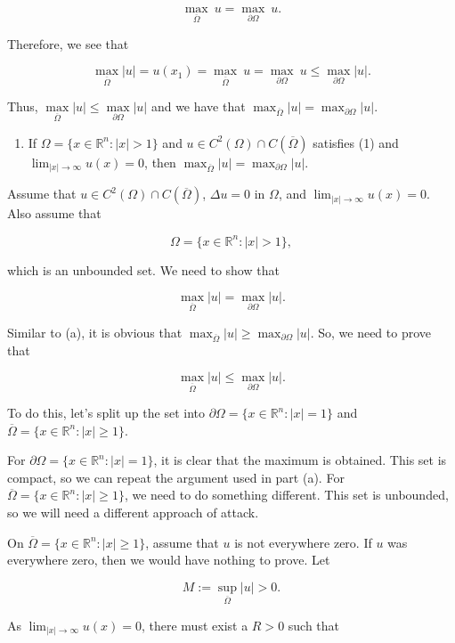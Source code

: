 \documentclass{article}
\begin{document}
$$\underset{\overline\Omega}{\max}~u =\underset{\partial\Omega}{\max}~u.$$

Therefore, we see that

$$\underset{\overline\Omega}{\max}|u|=u(x_1)=\underset{\overline\Omega}{\max}~u=\underset{\partial\Omega}{\max}~u\leq \underset{\partial\Omega}{\max}|u|.$$

Thus, $\underset{\overline\Omega}{\max}|u| \leq\underset{\partial\Omega}{\max}|u|$ and we have that $\max_{\overline\Omega}|u| =\max_{\partial\Omega}|u|$.

\begin{enumerate}[label=(\alph*),start=2]
    \item If $\Omega=\{x\in\mathbb R^n : |x| > 1\}$ and $u\in C^2(\Omega)\cap C(\overline\Omega)$ satisfies (1) and $\lim_{|x|\to\infty}u(x)=0$, then $\max_{\overline\Omega}|u| =\max_{\partial\Omega}|u|$.
\end{enumerate}

Assume that $u\in C^2(\Omega)\cap C(\overline\Omega)$, $\Delta u = 0$ in $\Omega$, and $\lim_{|x|\to\infty}u(x)=0$. Also assume that 

$$\Omega=\{x\in\mathbb R^n : |x| > 1\},$$

which is an unbounded set. We need to show that

$$\underset{\overline\Omega}{\max}|u| =\underset{\partial\Omega}{\max}|u|.$$

Similar to (a), it is obvious that $\max_{\overline\Omega}|u| \geq \max_{\partial\Omega}|u|$. So, we need to prove that

$$\underset{\overline\Omega}{\max}|u| \leq\underset{\partial\Omega}{\max}|u|.$$

To do this, let's split up the set into $\partial\Omega=\{x\in\mathbb R^n : |x| = 1\}$ and $\overline\Omega=\{x\in\mathbb R^n : |x| \geq 1\}$.

For $\partial\Omega=\{x\in\mathbb R^n : |x| = 1\}$, it is clear that the maximum is obtained. This set is compact, so we can repeat the argument used in part (a). For $\overline\Omega=\{x\in\mathbb R^n : |x| \geq 1\}$, we need to do something different. This set is unbounded, so we will need a different approach of attack.

On $\overline\Omega=\{x\in\mathbb R^n : |x| \geq 1\}$, assume that $u$ is not everywhere zero. If $u$ was everywhere zero, then we would have nothing to prove. Let

$$M:=\underset{\overline\Omega}{\sup}|u|>0.$$

As $\lim_{|x|\to\infty}u(x)=0$, there must exist a $R>0$ such that
\end{document}
